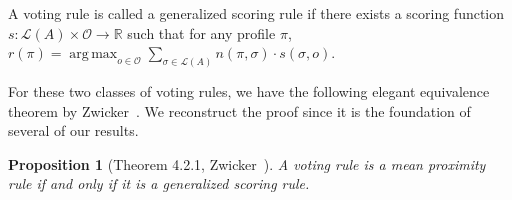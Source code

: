 \documentclass[10pt,letterpaper]{article}
\newcommand{\calL}{{\mathcal{L}}}
\newcommand{\rank}{{\calL(A)}}
\newcommand{\calO}{{\mathcal{O}}}
\DeclareMathOperator*{\argmax}{arg\,max}
\newtheorem{proposition}{Proposition}
\newenvironment{definition}[1][Definition]{\begin{trivlist}
\item[\hskip \labelsep {\bfseries #1}]}{\end{trivlist}}
\begin{document}

\begin{definition}[Generalized Scoring Rules (Zwicker~\cite{Zwicker08a})]
A voting rule is called a generalized scoring rule if there exists a scoring function $s : \rank \times \calO \rightarrow \mathbb{R}$ such that for any profile $\pi$, $r(\pi) = \argmax_{o \in \calO} \sum_{\sigma \in \rank} n(\pi,\sigma) \cdot s(\sigma,o)$. 
\end{definition}


For these two classes of voting rules, we have the following elegant equivalence theorem by Zwicker~\cite{Zwicker08a}. We reconstruct the proof since it is the foundation of several of our results.
\begin{proposition}[Theorem 4.2.1, Zwicker~\cite{Zwicker08a}]
A voting rule is a mean proximity rule if and only if it is a generalized scoring rule.
\label{prop:equiv}
\end{proposition}
\end{document}
